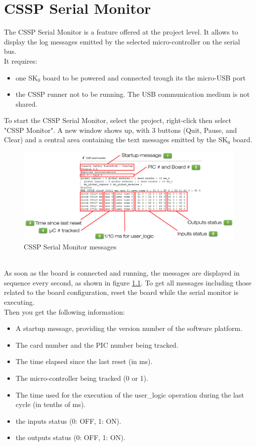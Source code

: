 \chapter{CSSP Serial Monitor}

The CSSP Serial Monitor is a feature offered at the project level. It allows to display the log messages emitted by the selected micro-controller on the serial bus. \\
It requires:
\begin{itemize}
    \item one SK$_0$ board to be powered and connected trough its the micro-USB port
    \item the CSSP runner not to be running. The USB communication medium is not shared.
\end{itemize}
To start the CSSP Serial Monitor, select the project, right-click then select "CSSP Monitor". A new window shows up, with 3 buttons (Quit, Pause, and Clear) and a central area containing the text messages emitted by the SK$_0$ board.
\begin{figure}[h]
\centering\includegraphics[scale=0.30]{Pictures/chapterAnnexes/traces-serial-monitor.png}
\caption{CSSP Serial Monitor messages}
\label{annexes:SK0-serial-monitor}
\end{figure} \\
As soon as the board is connected and running, the messages are displayed in sequence every second, as shown in figure \ref{annexes:SK0-serial-monitor}. To get all messages including those related to the board configuration, reset the board while the serial monitor is executing. \\
Then you get the following information:
\begin{itemize}
    \item A startup message, providing the version number of the software platform.
    \item The card number and the PIC number being tracked.
    \item The time elapsed since the last reset (in ms).
    \item The micro-controller being tracked (0 or 1).
    \item The time used for the execution of the user\_logic operation during the last cycle (in tenths of ms).
    \item the inputs status (0: OFF, 1: ON).
    \item the outputs status (0: OFF, 1: ON).
\end{itemize}
